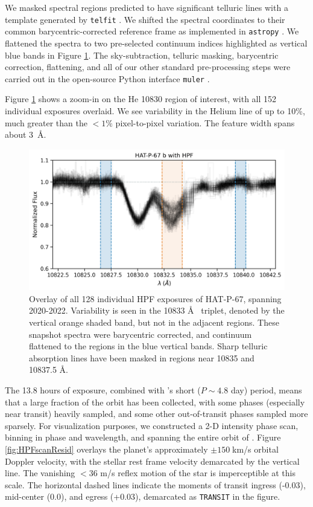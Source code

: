 \documentclass[twocolumn]{aastex631}
\begin{document}
We masked spectral regions predicted to have significant telluric lines with a template generated by \texttt{telfit} \citep{2014AJ....148...53G}.  We shifted the spectral coordinates to their common barycentric-corrected reference frame \citep{2014PASP..126..838W} as implemented in \texttt{astropy} \citep{2013A&A...558A..33A,2018AJ....156..123A,2022ApJ...935..167A}.  We flattened the spectra to two pre-selected continuum indices highlighted as vertical blue bands in Figure \ref{fig:HPFheliumOverview}.  The sky-subtraction, telluric masking, barycentric correction, flattening, and all of our other standard pre-processing steps were carried out in the open-source Python interface \texttt{muler} \citep{2022JOSS....7.4302G}.

Figure \ref{fig:HPFheliumOverview} shows a zoom-in on the He 10830 region of interest, with all 152 individual exposures overlaid.  We see variability in the Helium line of up to 10\%, much greater than the $<1\%$ pixel-to-pixel variation.  The feature width spans about 3~\AA.

\begin{figure}
    \includegraphics[width=\linewidth]{figures/HAT_P_67b_He_spectrum.png}
    \caption{Overlay of all 128 individual HPF exposures of HAT-P-67, spanning 2020-2022. Variability is seen in the  10833 \AA~ triplet, denoted by the vertical orange shaded band, but not in the adjacent regions.  These snapshot spectra were barycentric corrected, and continuum flattened to the regions in the blue vertical bands.  Sharp telluric absorption lines have been masked in regions near 10835 and 10837.5 \AA.}
    \label{fig:HPFheliumOverview}
\end{figure}


The 13.8 hours of exposure, combined with 's short ($P\sim4.8$ day) period, means that a large fraction of the orbit has been collected, with some phases (especially near transit) heavily sampled, and some other out-of-transit phases sampled more sparsely. For visualization purposes, we constructed a 2-D intensity phase scan, binning in phase and wavelength, and spanning the entire orbit of .  Figure \ref{fig:HPFscanResid} overlays the planet's approximately $\pm150\;$km/s orbital Doppler velocity, with the stellar rest frame velocity demarcated by the vertical line.  The vanishing $<36$ m/s reflex motion of the star is imperceptible at this scale.  The horizontal dashed lines indicate the moments of transit ingress (-0.03), mid-center (0.0), and egress (+0.03), demarcated as \texttt{TRANSIT} in the figure.
\end{document}

